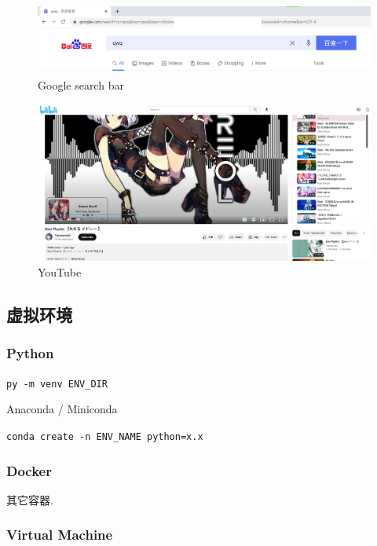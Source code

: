 \documentclass[a4paper]{article}
\begin{document}
\begin{figure}[hb]
    \centering
    \includegraphics[height=.15\textheight]{figures/search.png}
    \caption{Google search bar}
\end{figure}

\begin{figure}[hb]
    \centering
    \includegraphics[height=.3\textheight]{figures/ytb.png}
    \caption{YouTube}
\end{figure}

\subsection{\LARGE 虚拟环境}

\subsubsection{\LARGE Python}

{\tt py -m venv ENV\_DIR}

Anaconda / Miniconda

{\tt conda create -n ENV\_NAME python=x.x}

\subsubsection{\LARGE Docker}

其它容器.

\subsubsection{\LARGE Virtual Machine}
\end{document}
